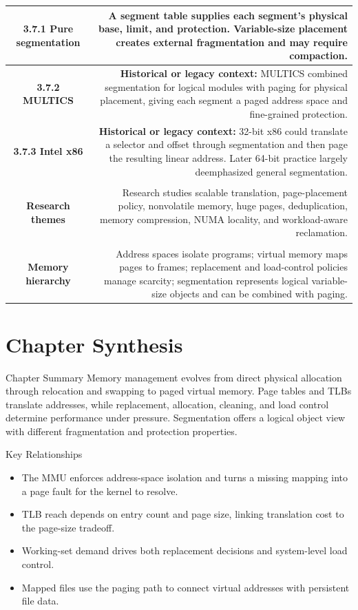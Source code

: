 \documentclass[10pt,letterpaper]{article}
\begin{document}
\begin{longtable}{C N}
\textbf{3.7.1 Pure segmentation} & A segment table supplies each segment's physical base, limit, and protection. Variable-size placement creates external fragmentation and may require compaction.\\\hline
\textbf{3.7.2 MULTICS} & \textcolor{legacy}{\textbf{Historical or legacy context:}} MULTICS combined segmentation for logical modules with paging for physical placement, giving each segment a paged address space and fine-grained protection.\\\hline
\textbf{3.7.3 Intel x86} & \textcolor{legacy}{\textbf{Historical or legacy context:}} 32-bit x86 could translate a selector and offset through segmentation and then page the resulting linear address. Later 64-bit practice largely deemphasized general segmentation.\\\hline
{}\\*\hline
\textbf{Research themes} & Research studies scalable translation, page-placement policy, nonvolatile memory, huge pages, deduplication, memory compression, NUMA locality, and workload-aware reclamation.\\\hline
{}\\*\hline
\textbf{Memory hierarchy} & Address spaces isolate programs; virtual memory maps pages to frames; replacement and load-control policies manage scarcity; segmentation represents logical variable-size objects and can be combined with paging.\\\hline
\end{longtable}
\normalsize

\section*{Chapter Synthesis}
\begin{studybox}{Chapter Summary}
Memory management evolves from direct physical allocation through relocation and swapping to paged virtual memory. Page tables and TLBs translate addresses, while replacement, allocation, cleaning, and load control determine performance under pressure. Segmentation offers a logical object view with different fragmentation and protection properties.
\end{studybox}

\begin{studybox}{Key Relationships}
\begin{itemize}
  \item The MMU enforces address-space isolation and turns a missing mapping into a page fault for the kernel to resolve.
  \item TLB reach depends on entry count and page size, linking translation cost to the page-size tradeoff.
  \item Working-set demand drives both replacement decisions and system-level load control.
  \item Mapped files use the paging path to connect virtual addresses with persistent file data.
\end{itemize}
\end{studybox}
\end{document}
